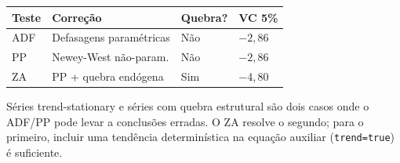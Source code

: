 \begin{center}
\begin{tabular}{llll}
\toprule
\textbf{Teste} & \textbf{Correção} & \textbf{Quebra?} & \textbf{VC 5\%} \\
\midrule
ADF      & Defasagens paramétricas & Não & $-2{,}86$ \\
PP       & Newey-West não-param.   & Não & $-2{,}86$ \\
ZA       & PP + quebra endógena    & Sim & $-4{,}80$ \\
\bottomrule
\end{tabular}
\end{center}

\begin{nota}
  Séries trend-stationary e séries com quebra estrutural são dois casos onde
  o ADF/PP pode levar a conclusões erradas. O ZA resolve o segundo; para o
  primeiro, incluir uma tendência determinística na equação auxiliar
  (\texttt{trend=true}) é suficiente.
\end{nota}

